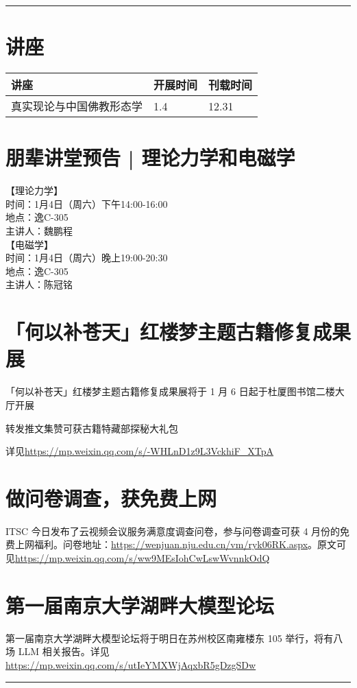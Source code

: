\documentclass[letterpaper, 12pt]{article}
\begin{document}
\hrule
\pagebreak
\begin{multicols}{2}

\section{讲座}
\begin{tabularx}{0.5\textwidth}{|X|X|X|}
    \hline
    讲座 & 开展时间 & 刊载时间\\
    \hline\hline
真实现论与中国佛教形态学 & 1.4 & 12.31\\\hline
\end{tabularx}
\section{朋辈讲堂预告 | 理论力学和电磁学}
【理论力学】\\
时间：1月4日（周六）下午14:00-16:00\\
地点：逸C-305\\
主讲人：魏鹏程\\
【电磁学】\\
时间：1月4日（周六）晚上19:00-20:30\\
地点：逸C-305\\
主讲人：陈冠铭\\
\section{「何以补苍天」红楼梦主题古籍修复成果展}
「何以补苍天」红楼梦主题古籍修复成果展将于 1 月 6 日起于杜厦图书馆二楼大厅开展

转发推文集赞可获古籍特藏部探秘大礼包

详见\url{https://mp.weixin.qq.com/s/-WHLnD1z9L3VckhiF_XTpA}
\section{做问卷调查，获{\color{red}免费上网}}
ITSC 今日发布了云视频会议服务满意度调查问卷，参与问卷调查可获 4 月份的免费上网福利。问卷地址：\url{https://wenjuan.nju.edu.cn/vm/ryk06RK.aspx}。原文可见\url{https://mp.weixin.qq.com/s/ww9MEsIohCwLswWvnnkOdQ}
\section{第一届南京大学湖畔大模型论坛}
第一届南京大学湖畔大模型论坛将于明日在苏州校区南雍楼东 105 举行，将有八场 LLM 相关报告。详见\url{https://mp.weixin.qq.com/s/utIeYMXWjAqxbR5gDzgSDw}
\end{multicols} 
\hrule
\end{document}
